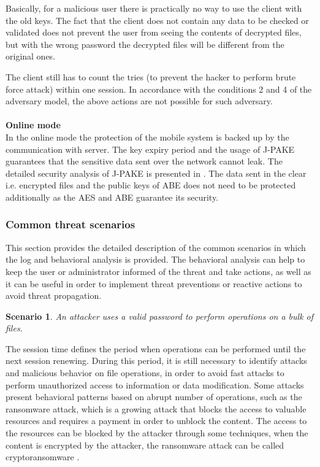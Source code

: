 \documentclass[twocolumn]{svjour3}          	%
\newtheorem{thm}{Scenario}
\begin{document}
Basically, for a malicious user there is practically no way to use the client with the old keys. The fact that the client does not contain any data to be checked or validated does not prevent the user from seeing the contents of decrypted files, but with the wrong password the decrypted files will be different from the original ones.

The client still has to count the tries (to prevent the hacker to perform brute force attack) within one session. In accordance with the conditions 2 and 4 of the adversary model, the above actions are not possible for such adversary.
\\
\\
\textbf{Online mode}\\

In the online mode the protection of the mobile system is backed up by the communication with server. The key expiry period and the usage of J-PAKE \cite{hao2010j,hao2008password} guarantees that the sensitive data sent over the network cannot leak. The detailed security analysis of J-PAKE is presented in \cite{toorani2014security}. The data sent in the clear i.e. encrypted files and the public keys of ABE does not need to be protected additionally as the AES and ABE guarantee its security.

\subsubsection{Common threat scenarios}
\label{sec_common}
This section provides the detailed description of the common scenarios in which the log and behavioral analysis is provided. The behavioral analysis can help to keep the user or administrator informed of the threat and take actions, as well as it can be useful in order to implement threat preventions or reactive actions to avoid threat propagation.

\begin{thm}
An attacker uses a valid password to perform operations on a bulk of files.
\end{thm}

The session time defines the period when operations can be performed until the next session renewing. During this period, it is still necessary to identify attacks and malicious behavior on file operations, in order to avoid fast attacks to perform unauthorized access to information or data modification. Some attacks present behavioral patterns based on abrupt number of operations, such as the ransomware attack, which is a growing attack \cite{McAfee2015} that blocks the access to valuable resources and requires a payment in order to unblock the content. The access to the resources can be blocked by the attacker through some techniques, when the content is encrypted by the attacker, the ransomware attack can be called cryptoransomware \cite{kaspersky2014}.
\end{document}
